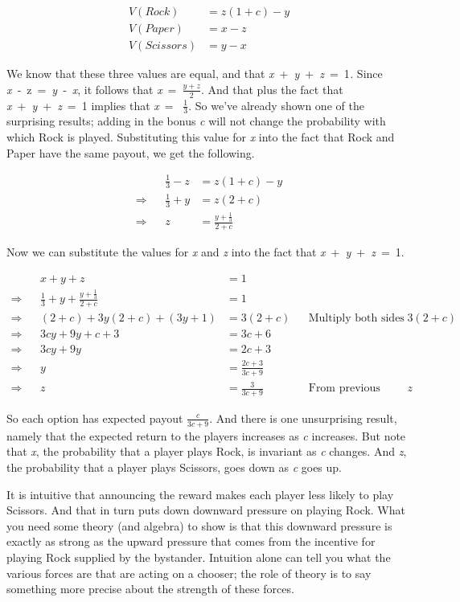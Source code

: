 \documentclass[
  12pt,
  letterpaper,
  DIV=11,
  numbers=noendperiod]{scrreprt}
\begin{document}
\begin{align*}
V(Rock) &= z(1+c) - y \\
V(Paper) &= x - z \\
V(Scissors) &= y - x
\end{align*}

We know that these three values are equal, and that
\emph{x}~+~\emph{y}~+~\emph{z}~=~1\emph{.} Since
\emph{x}~‑~z~=~\emph{y}~‑~\emph{x}, it follows that
\emph{x}~=~\(\frac{y+z}{2}\). And that plus the fact that
\emph{x}~+~\emph{y}~+~\emph{z}~=~1 implies that \emph{x}~=~
\(\frac{1}{3}\). So we've already shown one of the surprising results;
adding in the bonus \emph{c} will not change the probability with which
Rock is played. Substituting this value for \emph{x} into the fact that
Rock and Paper have the same payout, we get the following.

\begin{align*}
&& \frac{1}{3} - z &= z(1+c) - y \\
\Rightarrow && \frac{1}{3} + y &= z(2+c) \\
\Rightarrow && z &= \frac{y + \frac{1}{3}}{2 + c}
\end{align*}

Now we can substitute the values for \emph{x} and \emph{z} into the fact
that \emph{x}~+~\emph{y}~+~\emph{z}~=~1.

\begin{align*}
&& x + y + z &= 1  && \\
\Rightarrow && \frac{1}{3} + y + \frac{y + \frac{1}{3}}{2 + c} &= 1 && \\
\Rightarrow && (2+c) + 3y(2+c) + (3y+1) &= 3(2+c) && \text{Multiply both sides by } 3(2+c) \\
\Rightarrow && 3cy + 9y + c + 3 &= 3c + 6 \\
\Rightarrow && 3cy + 9y &= 2c + 3 \\
\Rightarrow && y &= \frac{2c + 3}{3c + 9} \\
\Rightarrow && z &= \frac{3}{3c + 9} && \text{From previous derivation for }z
\end{align*}

So each option has expected payout \(\frac{c}{3c+9}\). And there is one
unsurprising result, namely that the expected return to the players
increases as \emph{c} increases. But note that \emph{x}, the probability
that a player plays Rock, is invariant as \emph{c} changes. And
\emph{z}, the probability that a player plays Scissors, goes down as
\emph{c} goes up.

It is intuitive that announcing the reward makes each player less likely
to play Scissors. And that in turn puts down downward pressure on
playing Rock. What you need some theory (and algebra) to show is that
this downward pressure is exactly as strong as the upward pressure that
comes from the incentive for playing Rock supplied by the bystander.
Intuition alone can tell you what the various forces are that are acting
on a chooser; the role of theory is to say something more precise about
the strength of these forces.
\end{document}
